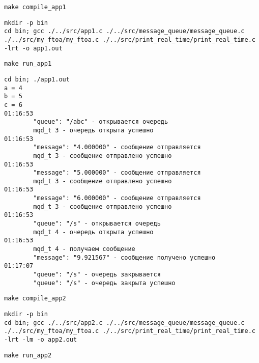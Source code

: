 %

\begin{lstlisting}[language=Terminal, basicstyle=\ttfamily\scriptsize]
make compile_app1
\end{lstlisting}

\begin{lstlisting}[language=Out, basicstyle=\ttfamily\scriptsize]
mkdir -p bin
cd bin; gcc ./../src/app1.c ./../src/message_queue/message_queue.c ./../src/my_ftoa/my_ftoa.c ./../src/print_real_time/print_real_time.c -lrt -o app1.out
\end{lstlisting}

\begin{lstlisting}[language=Terminal, basicstyle=\ttfamily\scriptsize]
make run_app1
\end{lstlisting}

\begin{lstlisting}[language=Out, basicstyle=\ttfamily\scriptsize]
cd bin; ./app1.out
a = 4
b = 5
c = 6
01:16:53
        "queue": "/abc" - открывается очередь
        mqd_t 3 - очередь открыта успешно
01:16:53
        "message": "4.000000" - сообщение отправляется
        mqd_t 3 - сообщение отправлено успешно
01:16:53
        "message": "5.000000" - сообщение отправляется
        mqd_t 3 - сообщение отправлено успешно
01:16:53
        "message": "6.000000" - сообщение отправляется
        mqd_t 3 - сообщение отправлено успешно
01:16:53
        "queue": "/s" - открывается очередь
        mqd_t 4 - очередь открыта успешно
01:16:53
        mqd_t 4 - получаем сообщение
        "message": "9.921567" - сообщение получено успешно
01:17:07
        "queue": "/s" - очередь закрывается
        "queue": "/s" - очередь закрыта успешно
\end{lstlisting}

\newpage

\begin{lstlisting}[language=Terminal, basicstyle=\ttfamily\scriptsize]
make compile_app2
\end{lstlisting}
    
\begin{lstlisting}[language=Out, basicstyle=\ttfamily\scriptsize]
mkdir -p bin
cd bin; gcc ./../src/app2.c ./../src/message_queue/message_queue.c ./../src/my_ftoa/my_ftoa.c ./../src/print_real_time/print_real_time.c -lrt -lm -o app2.out
\end{lstlisting}
    
\begin{lstlisting}[language=Terminal, basicstyle=\ttfamily\scriptsize]
make run_app2
\end{lstlisting}
    
